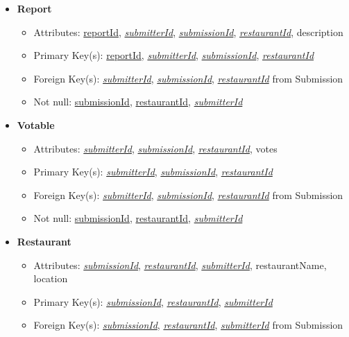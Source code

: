 \documentclass{article}
\begin{document}
\begin{itemize}
        \item \textbf{Report}
        \begin{itemize}
            \item Attributes: \underline{reportId}, \underline{\textit{submitterId}}, \underline{\textit{submissionId}}, \underline{\textit{restaurantId}}, description
            \item Primary Key(s): \underline{reportId}, \underline{\textit{submitterId}}, \underline{\textit{submissionId}}, \underline{\textit{restaurantId}}
            \item Foreign Key(s): \underline{\textit{submitterId}}, \underline{\textit{submissionId}}, \underline{\textit{restaurantId}} from Submission
            \item Not null: \underline{submissionId}, \underline{restaurantId}, \underline{\textit{submitterId}}
        \end{itemize}
            
        \item \textbf{Votable}
        \begin{itemize}
            \item Attributes: \underline{\textit{submitterId}}, \underline{\textit{submissionId}}, \underline{\textit{restaurantId}}, votes
            \item Primary Key(s): \underline{\textit{submitterId}}, \underline{\textit{submissionId}}, \underline{\textit{restaurantId}}
            \item Foreign Key(s): \underline{\textit{submitterId}}, \underline{\textit{submissionId}}, \underline{\textit{restaurantId}} from Submission
            \item Not null: \underline{submissionId}, \underline{restaurantId}, \underline{\textit{submitterId}}
        \end{itemize}

        \item \textbf{Restaurant}
        \begin{itemize}
            \item Attributes: \underline{\textit{submissionId}}, \underline{\textit{restaurantId}}, \underline{\textit{submitterId}}, restaurantName, location
            \item Primary Key(s): \underline{\textit{submissionId}}, \underline{\textit{restaurantId}}, \underline{\textit{submitterId}}
            \item Foreign Key(s): \underline{\textit{submissionId}}, \underline{\textit{restaurantId}}, \underline{\textit{submitterId}} from Submission
        \end{itemize}


\end{itemize}
\end{document}
